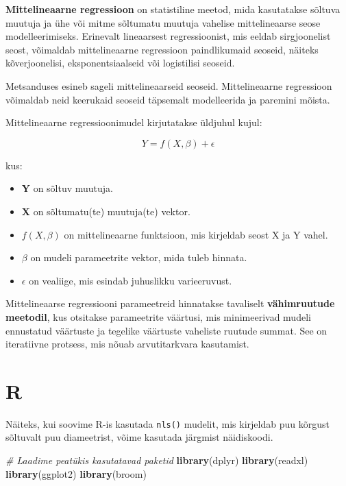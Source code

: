 \documentclass[
]{book}
\newenvironment{Shaded}{\begin{snugshade}}{\end{snugshade}}
\newcommand{\CommentTok}[1]{\textcolor[rgb]{0.56,0.35,0.01}{\textit{#1}}}
\newcommand{\FunctionTok}[1]{\textcolor[rgb]{0.13,0.29,0.53}{\textbf{#1}}}
\newcommand{\NormalTok}[1]{#1}
\providecommand{\tightlist}{%
  \setlength{\itemsep}{0pt}\setlength{\parskip}{0pt}}
\renewenvironment{Shaded} {\begin{snugshade}\footnotesize} {\end{snugshade}}
\theoremstyle{definition}
\theoremstyle{definition}
\theoremstyle{definition}
\theoremstyle{definition}
\theoremstyle{remark}
\begin{document}
\textbf{Mittelineaarne regressioon} on statistiline meetod, mida kasutatakse sõltuva muutuja ja ühe või mitme sõltumatu muutuja vahelise mittelineaarse seose modelleerimiseks. Erinevalt lineaarsest regressioonist, mis eeldab sirgjoonelist seost, võimaldab mittelineaarne regressioon paindlikumaid seoseid, näiteks kõverjoonelisi, eksponentsiaalseid või logistilisi seoseid.

Metsanduses esineb sageli mittelineaarseid seoseid. Mittelineaarne regressioon võimaldab neid keerukaid seoseid täpsemalt modelleerida ja paremini mõista.

Mittelineaarne regressioonimudel kirjutatakse üldjuhul kujul:

\[Y = f(X, \beta) + \epsilon\]

kus:

\begin{itemize}
\tightlist
\item
  \textbf{Y} on sõltuv muutuja.
\item
  \textbf{X} on sõltumatu(te) muutuja(te) vektor.
\item
  \textbf{\(f(X, \beta)\)} on mittelineaarne funktsioon, mis kirjeldab seost X ja Y vahel.
\item
  \textbf{\(\beta\)} on mudeli parameetrite vektor, mida tuleb hinnata.
\item
  \textbf{\(\epsilon\)} on vealiige, mis esindab juhuslikku varieeruvust.
\end{itemize}

Mittelineaarse regressiooni parameetreid hinnatakse tavaliselt \textbf{vähimruutude meetodil}, kus otsitakse parameetrite väärtusi, mis minimeerivad mudeli ennustatud väärtuste ja tegelike väärtuste vaheliste ruutude summat. See on iteratiivne protsess, mis nõuab arvutitarkvara kasutamist.

\section{R}\label{r}

Näiteks, kui soovime R-is kasutada \texttt{nls()} mudelit, mis kirjeldab puu kõrgust sõltuvalt puu diameetrist, võime kasutada järgmist näidiskoodi.

\begin{Shaded}
\begin{Highlighting}[]
\CommentTok{\# Laadime peatükis kasutatavad paketid}
\FunctionTok{library}\NormalTok{(dplyr)}
\FunctionTok{library}\NormalTok{(readxl)}
\FunctionTok{library}\NormalTok{(ggplot2)}
\FunctionTok{library}\NormalTok{(broom)}
\end{Highlighting}
\end{Shaded}
\end{document}
